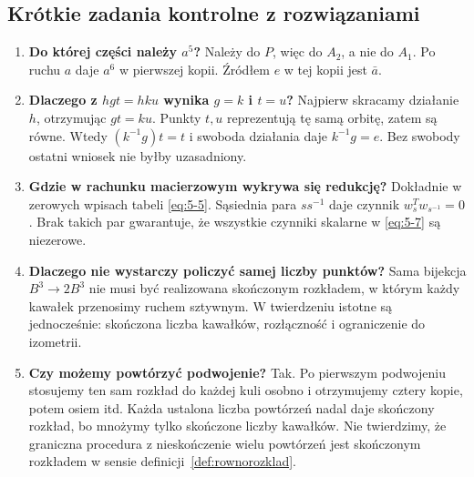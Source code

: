\subsection{Krótkie zadania kontrolne z rozwiązaniami}
\begin{enumerate}
\item \textbf{Do której części należy $a^5$?} Należy do $P$, więc do $A_2$, a nie do $A_1$. Po ruchu $a$ daje $a^6$ w pierwszej kopii. Źródłem $e$ w tej kopii jest $\bar a$.
\item \textbf{Dlaczego z $hgt=hku$ wynika $g=k$ i $t=u$?} Najpierw skracamy działanie $h$, otrzymując $gt=ku$. Punkty $t,u$ reprezentują tę samą orbitę, zatem są równe. Wtedy $(k^{-1}g)t=t$ i swoboda działania daje $k^{-1}g=e$. Bez swobody ostatni wniosek nie byłby uzasadniony.
\item \textbf{Gdzie w rachunku macierzowym wykrywa się redukcję?} Dokładnie w zerowych wpisach tabeli \eqref{eq:5-5}. Sąsiednia para $ss^{-1}$ daje czynnik $w_s^Tw_{s^{-1}}=0$. Brak takich par gwarantuje, że wszystkie czynniki skalarne w \eqref{eq:5-7} są niezerowe.
\item \textbf{Dlaczego nie wystarczy policzyć samej liczby punktów?} Sama bijekcja $B^3\to2B^3$ nie musi być realizowana skończonym rozkładem, w którym każdy kawałek przenosimy ruchem sztywnym. W twierdzeniu istotne są jednocześnie: skończona liczba kawałków, rozłączność i ograniczenie do izometrii.
\item \textbf{Czy możemy powtórzyć podwojenie?} Tak. Po pierwszym podwojeniu stosujemy ten sam rozkład do każdej kuli osobno i otrzymujemy cztery kopie, potem osiem itd. Każda ustalona liczba powtórzeń nadal daje skończony rozkład, bo mnożymy tylko skończone liczby kawałków. Nie twierdzimy, że graniczna procedura z nieskończenie wielu powtórzeń jest skończonym rozkładem w sensie definicji~\ref{def:rownorozklad}.
\end{enumerate}

